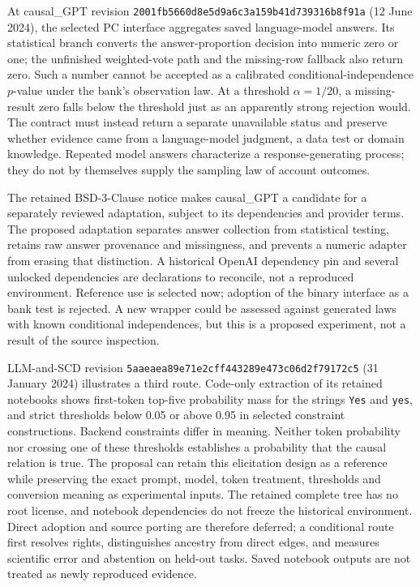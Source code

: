 At causal\_GPT revision
\texttt{2001fb5660d8e5d9a6c3}\allowbreak\texttt{a159b41d739316b8f91a}
(12 June 2024), the selected PC interface aggregates saved language-model
answers. Its statistical branch converts the answer-proportion decision into
numeric zero or one; the unfinished weighted-vote path and the missing-row
fallback also return zero. Such a number cannot be accepted as a calibrated
conditional-independence $p$-value under the bank's observation law. At a
threshold $\alpha=1/20$, a missing-result zero falls below the threshold just as
an apparently strong rejection would. The contract must instead return a
separate unavailable status and preserve whether evidence came from a
language-model judgment, a data test or domain knowledge. Repeated model
answers characterize a response-generating process; they do not by themselves
supply the sampling law of account outcomes.~\citep{exec14_iid_gpt,exec25_agents_choice}

The retained BSD-3-Clause notice makes causal\_GPT a candidate for a separately
reviewed adaptation, subject to its dependencies and provider terms. The
proposed adaptation separates answer collection from statistical testing,
retains raw answer provenance and missingness, and prevents a numeric adapter
from erasing that distinction. A historical OpenAI dependency pin and several
unlocked dependencies are declarations to reconcile, not a reproduced
environment. Reference use is selected now; adoption of the binary interface
as a bank test is rejected. A new wrapper could be assessed against generated
laws with known conditional independences, but this is a proposed experiment,
not a result of the source inspection.~\citep{exec14_iid_gpt,exec25_agents_choice}

LLM-and-SCD revision
\texttt{5aaeaea89e71e2cff443}\allowbreak\texttt{289e473c06d2f79172c5}
(31 January 2024) illustrates a third route. Code-only extraction of its
retained notebooks shows first-token top-five probability mass for the strings
\texttt{Yes} and \texttt{yes}, and strict thresholds below 0.05 or above 0.95
in selected constraint constructions. Backend constraints differ in meaning.
Neither token probability nor crossing one of these thresholds establishes a
probability that the causal relation is true. The proposal can retain this
elicitation design as a reference while preserving the exact prompt, model,
token treatment, thresholds and conversion meaning as experimental inputs.
The retained complete tree has no root license, and notebook dependencies do
not freeze the historical environment. Direct adoption and source porting are
therefore deferred; a conditional route first resolves rights, distinguishes
ancestry from direct edges, and measures scientific error and abstention on
held-out tasks. Saved notebook outputs are not treated as newly reproduced
evidence.~\citep{exec14_iid_scd,exec25_agents_choice}

